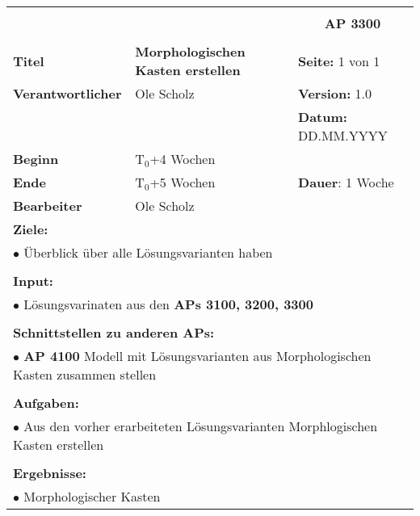\clearpage
\begin{table}[!h]
	\begin{center}
		\begin{tabular}{|p{35mm}||p{55mm}|p{50mm}||p{40mm}|}
			\hline
			\multicolumn{3}{|l||}{\textbf{}} & \multicolumn{1}{c|}{}\\
			\multicolumn{3}{|l||}{\textbf{}} & \multicolumn{1}{c|}{\textbf{AP 3300}}\\
			\multicolumn{3}{|l||}{\textbf{}} & \multicolumn{1}{c|}{}\\
			\hline\hline
			\textbf{Titel} & \multicolumn{2}{p{7cm}||}{\textbf{Morphologischen Kasten erstellen}} 
			& \textbf{Seite:} 1 von 1\\
			\hline
			\textbf{Verantwortlicher} & \multicolumn{2}{l||}{Ole Scholz} & \textbf{Version:} 1.0\\
			\hline
			\multicolumn{3}{|l||}{} & \textbf{Datum:} DD.MM.YYYY\\
			\hline\hline
			\textbf{Beginn} & \multicolumn{2}{l||}{T$_0$+4 Wochen} & \\
			\hline
			\textbf{Ende} & \multicolumn{2}{l||}{T$_0$+5 Wochen} & \textbf{Dauer}: 1 Woche\\
			\hline\hline
			\textbf{Bearbeiter} & \multicolumn{3}{l|}{Ole Scholz}\\
			\hline\hline
			\multicolumn{4}{|p{150mm}|}{\textbf{Ziele:}}\\
			\multicolumn{4}{|p{150mm}|}{$\bullet$ Überblick über alle Lösungsvarianten haben}\\
			\multicolumn{4}{|p{150mm}|}{}\\
			\multicolumn{4}{|p{150mm}|}{\textbf{Input:}}\\
			\multicolumn{4}{|p{150mm}|}{$\bullet$ Lösungsvarinaten aus den \textbf{APs 3100, 3200, 3300}}\\
			\multicolumn{4}{|p{150mm}|}{}\\
			\multicolumn{4}{|p{150mm}|}{\textbf{Schnittstellen zu anderen APs:}}\\
			\multicolumn{4}{|p{150mm}|}{$\bullet$ \textbf{AP 4100} Modell mit Lösungsvarianten aus Morphologischen Kasten zusammen stellen}\\
			\multicolumn{4}{|p{150mm}|}{}\\
			\multicolumn{4}{|p{150mm}|}{\textbf{Aufgaben:}}\\
			\multicolumn{4}{|p{150mm}|}{$\bullet$ Aus den vorher erarbeiteten Lösungsvarianten Morphlogischen Kasten erstellen}\\
			\multicolumn{4}{|p{150mm}|}{}\\
			\multicolumn{4}{|p{150mm}|}{\textbf{Ergebnisse:}}\\
			\multicolumn{4}{|p{150mm}|}{$\bullet$ Morphologischer Kasten}\\
			\hline
		\end{tabular}
	\end{center}
\end{table}

